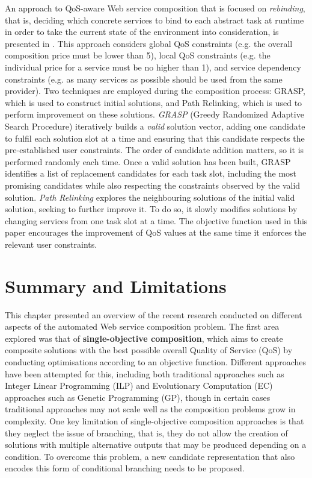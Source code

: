 An approach to QoS-aware Web service composition that is focused on \textit{rebinding}, that is, deciding which concrete services to bind to each abstract task at runtime in order to take the current state of the environment into consideration, is presented in \cite{parejo2014qos}. This approach considers global QoS constraints (e.g. the overall composition price must be lower than 5), local QoS constraints (e.g. the individual price for a service must be no higher than 1), and service dependency constraints (e.g. as many services as possible should be used from the same provider). Two techniques are employed during the composition process: GRASP, which is used to construct initial solutions, and Path Relinking, which is used to perform improvement on these solutions. \textit{GRASP} (Greedy Randomized Adaptive Search Procedure) iteratively builds a \textit{valid} solution vector, adding one candidate to fulfil each solution slot at a time and ensuring that this candidate respects the pre-established user constraints. The order of candidate addition matters, so it is performed randomly each time. Once a valid solution has been built, GRASP identifies a list of replacement candidates for each task slot, including the most promising candidates while also respecting the constraints observed by the valid solution. \textit{Path Relinking} explores the neighbouring solutions of the initial valid solution, seeking to further improve it. To do so, it slowly modifies solutions by changing services from one task slot at a time. The objective function used in this paper encourages the improvement of QoS values at the same time it enforces the relevant user constraints.

\section{Summary and Limitations}\label{summary}
This chapter presented an overview of the recent research conducted on different aspects of the automated Web service composition problem. The first area explored was that of \textbf{single-objective composition}, which aims to create composite solutions with the best possible overall Quality of Service (QoS) by conducting optimisations according to an objective function. Different approaches have been attempted for this, including both traditional approaches such as Integer Linear Programming (ILP) and Evolutionary Computation (EC) approaches such as Genetic Programming (GP), though in certain cases traditional approaches may not scale well as the composition problems grow in complexity. One key limitation of single-objective composition approaches is that they neglect the issue of branching, that is, they do not allow the creation of solutions with multiple alternative outputs that may be produced depending on a condition. To overcome this problem, a new candidate representation that also encodes this form of conditional branching needs to be proposed.

